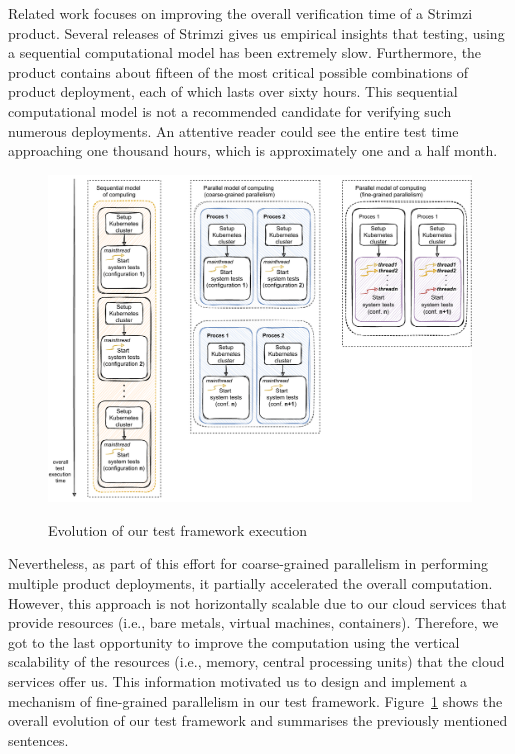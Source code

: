 Related work focuses on improving the overall verification time of a Strimzi product.
Several releases of Strimzi gives us empirical insights that testing, using a sequential computational model has been extremely slow.
Furthermore, the product contains about fifteen of the most critical possible combinations of product deployment, each of which lasts over sixty hours.
This sequential computational model is not a recommended candidate for verifying such numerous deployments.
An attentive reader could see the entire test time approaching one thousand hours, which is approximately one and a half month.
\begin{figure}[!ht]
    \centering
    \includegraphics[scale=0.7]{obrazky-figures/01-intro/00-intro-better-one}
    \label{00:fig:evolution}
    \caption{Evolution of our test framework execution}
\end{figure}
Nevertheless, as part of this effort for coarse-grained parallelism in performing multiple product deployments, it partially accelerated the overall computation.
However, this approach is not horizontally scalable due to our cloud services that provide resources (i.e., bare metals, virtual machines, containers).
Therefore, we got to the last opportunity to improve the computation using the vertical scalability of the resources (i.e., memory, central processing units) that the cloud services offer us.
This information motivated us to design and implement a mechanism of fine-grained parallelism in our test framework.
Figure~\ref{00:fig:evolution} shows the overall evolution of our test framework and summarises the previously mentioned sentences.
\bigskip

